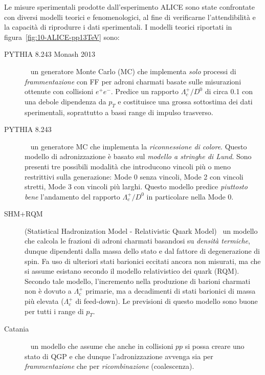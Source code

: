         Le misure sperimentali prodotte dall'esperimento ALICE sono state confrontate con diversi modelli teorici e fenomenologici, al fine di verificarne l'attendibilità e la capacità di riprodurre i dati sperimentali. I modelli teorici riportati in figura~\ref{fig:10-ALICE-pp13TeV} sono:
        \begin{description}
            \item[PYTHIA 8.243 Monash 2013]~\cite{SCR_2014} un generatore Monte Carlo (MC) che implementa \textit{solo} processi di \textit{frammentazione} con FF per adroni charmati basate sulle misurazioni ottenute con collisioni $e^{+} e^{-}$. Predice un rapporto $\Lambda_{c}^{+}/D^{0}$ di circa \num{0.1} con una debole dipendenza da $p_{T}$ e costituisce una grossa sottostima dei dati sperimentali, soprattutto a bassi range di impulso trasverso.

            \item[PYTHIA 8.243]~\cite{CS_2015} un generatore MC che implementa la \textit{riconnessione di colore}. Questo modello di adronizzazione è basato sul \textit{modello a stringhe di Lund}. Sono presenti tre possibili modalità che introducono vincoli più o meno restrittivi sulla generazione: Mode 0 senza vincoli, Mode 2 con vincoli stretti, Mode 3 con vincoli più larghi. Questo modello predice \textit{piuttosto bene} l’andamento del rapporto $\Lambda_{c}^{+}/D^{0}$ in particolare nella Mode 0.

            \item[SHM+RQM] (Statistical Hadronization Model - Relativistic Quark Model)~\cite{MR_2019} un modello che calcola le frazioni di adroni charmati basandosi su \textit{densità termiche}, dunque dipendenti dalla massa dello stato e dal fattore di degenerazione di spin. Fa uso di ulteriori stati barionici eccitati ancora non misurati, ma che si assume esistano secondo il modello relativistico dei quark (RQM). Secondo tale modello, l'incremento nella produzione di barioni charmati non è dovuto a $\Lambda_{c}^{+}$ primarie, ma a decadimenti di stati barionici di massa più elevata ($\Lambda_{c}^{+}$ di feed-down). Le previsioni di questo modello sono buone per tutti i range di $p_{T}$.

            \item[Catania]~\cite{PMDCG_2018} un modello che assume che anche in collisioni $pp$ si possa creare uno stato di QGP e che dunque l’adronizzazione avvenga sia per \textit{frammentazione} che per \textit{ricombinazione} (coalescenza).
            

\end{description}
